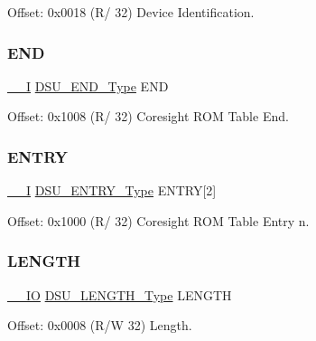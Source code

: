 Offset\+: 0x0018 (R/ 32) Device Identification. 

\mbox{\label{struct_dsu_a4091fe3b88164b1682ee02daeb49c62a}} 
\subsubsection{\texorpdfstring{END}{END}}
{\footnotesize\ttfamily \mbox{\hyperlink{core__cm0plus_8h_af63697ed9952cc71e1225efe205f6cd3}{\+\_\+\+\_\+I}} \mbox{\hyperlink{union_d_s_u___e_n_d___type}{D\+S\+U\+\_\+\+E\+N\+D\+\_\+\+Type}} E\+ND}



Offset\+: 0x1008 (R/ 32) Coresight R\+OM Table End. 

\mbox{\label{struct_dsu_ace4c71db0b7538ce5f07c40883d54a8c}} 
\subsubsection{\texorpdfstring{ENTRY}{ENTRY}}
{\footnotesize\ttfamily \mbox{\hyperlink{core__cm0plus_8h_af63697ed9952cc71e1225efe205f6cd3}{\+\_\+\+\_\+I}} \mbox{\hyperlink{union_d_s_u___e_n_t_r_y___type}{D\+S\+U\+\_\+\+E\+N\+T\+R\+Y\+\_\+\+Type}} E\+N\+T\+RY\mbox{[}2\mbox{]}}



Offset\+: 0x1000 (R/ 32) Coresight R\+OM Table Entry n. 

\mbox{\label{struct_dsu_aaa78c033db4ceb4d96c4250f684ef718}} 
\subsubsection{\texorpdfstring{LENGTH}{LENGTH}}
{\footnotesize\ttfamily \mbox{\hyperlink{core__cm0plus_8h_aec43007d9998a0a0e01faede4133d6be}{\+\_\+\+\_\+\+IO}} \mbox{\hyperlink{union_d_s_u___l_e_n_g_t_h___type}{D\+S\+U\+\_\+\+L\+E\+N\+G\+T\+H\+\_\+\+Type}} L\+E\+N\+G\+TH}



Offset\+: 0x0008 (R/W 32) Length. 

\mbox{\label{struct_dsu_a795f2b9189e004c3d638ee9c0c36232b}} 
